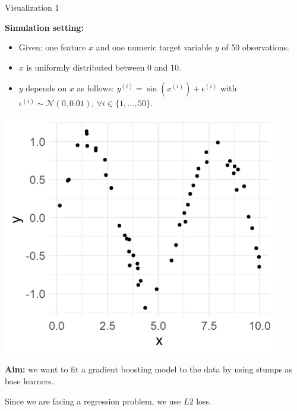 \begin{vbframe}{Visualization 1}
\begin{footnotesize}
\textbf{Simulation setting:}
\begin{itemize}
\item Given: one feature $x$ and one numeric target variable $y$ of 50 observations.
\item $x$ is uniformly distributed between 0 and 10.
\item $y$ depends on $x$ as follows: $y^{(i)} = \sin{(x^{(i)})} + \epsilon^{(i)}$ with $\epsilon^{(i)} \sim \mathcal{N}(0, 0.01)$, $\forall i \in \{1, \dots, 50\}$.
\end{itemize}

\vfill

\begin{minipage}[c]{0.55\textwidth}
  \vspace{0pt}%
  \includegraphics[width = 0.9\textwidth]{figure/gbm_anim_data.png}
\end{minipage}%
\begin{minipage}[c]{0.02\textwidth}
  \phantom{foo}
\end{minipage}%
\begin{minipage}[c]{0.4\textwidth}
  \vspace{0pt}%
  \raggedright
  \textbf{Aim:} we want to fit a gradient boosting model to the data by using 
  stumps as base learners.
  
  \lz
  Since we are facing a regression problem, we use $L2$ loss.
\end{minipage}%


\end{footnotesize}
\end{vbframe}
